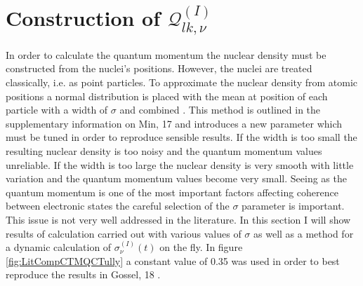 \section{Construction of $\mathcal{Q}_{lk, \nu}^{(I)}$}
\label{sect:SigmaSect}
In order to calculate the quantum momentum the nuclear density must be constructed from the nuclei's positions. However, the nuclei are treated classically, i.e. as point particles. To approximate the nuclear density from atomic positions a normal distribution is placed with the mean at position of each particle with a width of $\sigma$ and combined . This method is outlined in the supplementary information on Min, 17 \cite{min_ab_2017} and introduces a new parameter which must be tuned in order to reproduce sensible results. If the width is too small the resulting nuclear density is too noisy and the quantum momentum values unreliable. If the width is too large the nuclear density is very smooth with little variation and the quantum momentum values become very small. Seeing as the quantum momentum is one of the most important factors affecting coherence between electronic states the careful selection of the $\sigma$ parameter is important. This issue is not very well addressed in the literature. In this section I will show results of calculation carried out with various values of $\sigma$ 
as well as a method for a dynamic calculation of $\sigma^{(I)}_{\nu}(t)$ on the fly. In figure \ref{fig:LitCompCTMQCTully} a constant value of 0.35 was used in order to best reproduce the results in Gossel, 18 \cite{gossel_coupled-trajectory_2018}.
